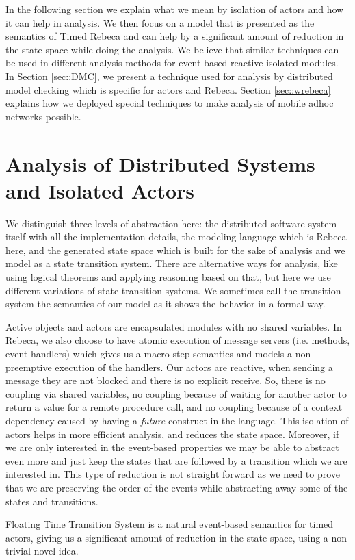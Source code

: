 In the following section we explain what we mean by isolation of actors and how it can help in analysis. We then focus on a model that is presented as the semantics of Timed Rebeca and can help by a significant amount of reduction in the state space while doing the analysis. We believe that similar techniques can be used in different analysis methods for event-based reactive isolated modules. 
%
In Section \ref{sec::DMC}, we present a technique used for analysis by distributed model checking which is specific for actors and Rebeca.
%
Section \ref{sec::wrebeca} explains how we deployed special techniques to make analysis of  mobile adhoc networks possible.

\section{Analysis of Distributed Systems and Isolated Actors}
We distinguish three levels of abstraction here: the distributed software system itself with all the implementation details, the modeling language which is Rebeca here, and the generated state space which is built for the sake of analysis and  we model as a state transition system. There are alternative ways for analysis, like using logical theorems and applying reasoning based on that, but here we use different variations of state transition systems.
We sometimes call the transition system the semantics of our model as it shows the behavior in a formal way.


Active objects and actors are encapsulated modules with no shared variables. In Rebeca, we also choose to have atomic execution of message servers (i.e. methods, event handlers) which gives us a macro-step semantics and models a non-preemptive execution of the handlers.
Our actors are reactive, when sending a message they are not blocked and there is no explicit receive. So, there is no coupling via shared variables, no coupling because of waiting for another actor to return a value for a remote procedure call, and no coupling because of a context dependency caused by having a \textit{future}  construct in the language.
This isolation of actors helps in more efficient analysis, and reduces the state space.
Moreover, if we are only interested in the event-based properties we may be able to abstract even more and just keep the states that are followed by a transition which we are interested in. This type of reduction is not straight forward as we need to prove that we are preserving the order of the events while abstracting away some of the states and transitions. 

Floating Time Transition System is a natural event-based semantics for timed actors, giving us a significant amount of reduction in the state space, using a non-trivial novel idea.
	